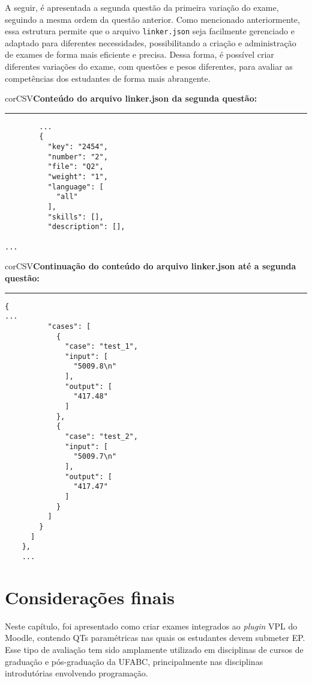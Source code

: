 A seguir, é apresentada a segunda questão da primeira variação do exame, seguindo a mesma ordem da questão anterior. Como mencionado anteriormente, essa estrutura permite que o arquivo \verb|linker.json| seja facilmente gerenciado e adaptado para diferentes necessidades, possibilitando a criação e administração de exames de forma mais eficiente e precisa. Dessa forma, é possível criar diferentes variações do exame, com questões e pesos diferentes, para avaliar as competências dos estudantes de forma mais abrangente.


\begin{myboxCode}{corCSV}{\textbf{Conteúdo do arquivo linker.json da segunda questão:}}\vspace{3mm}
\hrule
{\scriptsize 
\begin{verbatim}
        ...
        {
          "key": "2454",
          "number": "2",
          "file": "Q2",
          "weight": "1",
          "language": [
            "all"
          ],
          "skills": [],
          "description": [],

...
\end{verbatim}
}
\end{myboxCode}

\begin{myboxCode}{corCSV}{\textbf{Continuação do conteúdo do arquivo linker.json até a segunda questão:}}\vspace{3mm}
\hrule
{\scriptsize 
\begin{verbatim}
{
... 
          "cases": [
            {
              "case": "test_1",
              "input": [
                "5009.8\n"
              ],
              "output": [
                "417.48"
              ]
            },
            {
              "case": "test_2",
              "input": [
                "5009.7\n"
              ],
              "output": [
                "417.47"
              ]
            }
          ]
        }
      ]
    },
    ...
\end{verbatim}
}
\end{myboxCode}

\section{Considerações finais}

Neste capítulo, foi apresentado como criar exames integrados ao \textit{plugin} VPL do Moodle, contendo QTs paramétricas nas quais os estudantes devem submeter EP. Esse tipo de avaliação tem sido amplamente utilizado em disciplinas de cursos de graduação e pós-graduação da UFABC, principalmente nas disciplinas introdutórias envolvendo programação.

